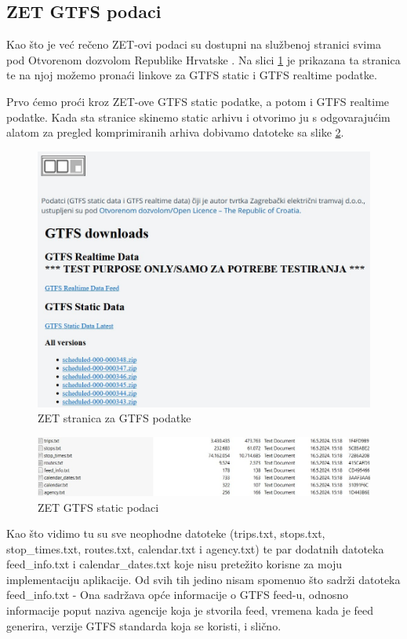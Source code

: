 \documentclass[zavrsnirad]{fer}
\begin{document}
\subsection{ZET GTFS podaci}
\label{sec:zet-gtfs}

Kao što je već rečeno ZET-ovi podaci su dostupni na službenoj stranici svima pod Otvorenom dozvolom Republike Hrvatske \cite{ZET-GTFS}. Na slici \ref{slk:zet-stranica} je prikazana ta stranica te na njoj možemo pronaći linkove za GTFS static i GTFS realtime podatke.

Prvo ćemo proći kroz ZET-ove GTFS static podatke, a potom i GTFS realtime podatke. Kada sta stranice skinemo static arhivu i otvorimo ju s odgovarajućim alatom za pregled komprimiranih arhiva dobivamo datoteke sa slike \ref{slk:zet-podaci}.

\begin{figure}[htb]
	\centering
	\includegraphics[width=0.7\linewidth]{Figures/zet-stranica.jpg} 
	\caption{ZET stranica za GTFS podatke}
	\label{slk:zet-stranica}
\end{figure} 

\begin{figure}[htb]
	\centering
	\includegraphics[width=0.7\linewidth]{Figures/zet-podaci.jpg} 
	\caption{ZET GTFS static podaci}
	\label{slk:zet-podaci}
\end{figure} 

Kao što vidimo tu su sve neophodne datoteke (trips.txt, stops.txt, stop\_times.txt, routes.txt, calendar.txt i agency.txt) te par dodatnih datoteka feed\_info.txt i calendar\_dates.txt koje nisu pretežito korisne za moju implementaciju aplikacije. Od svih tih jedino nisam spomenuo što sadrži datoteka feed\_info.txt - Ona sadržava opće informacije o GTFS feed-u, odnosno  informacije poput naziva agencije koja je stvorila feed, vremena kada je feed generira, verzije GTFS standarda koja se koristi, i slično.
\end{document}
